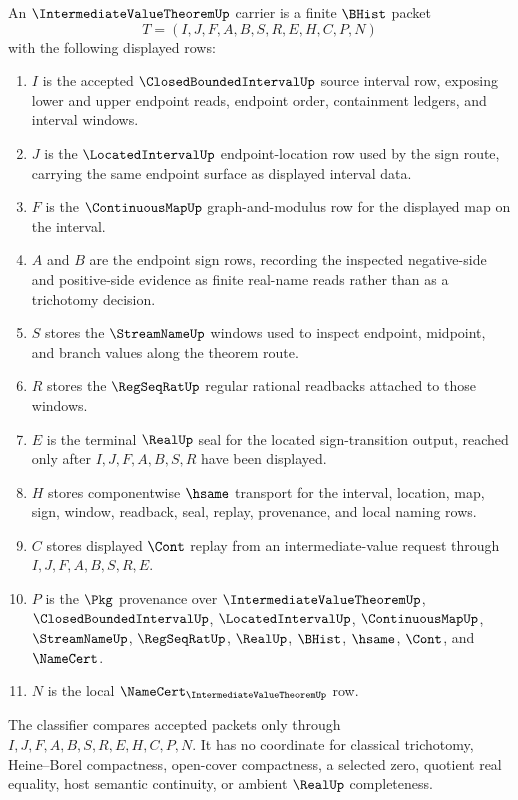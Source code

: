 \begin{definition}
\label{def:intermediate-value-theorem-carrier}
An $\IntermediateValueTheoremUp$ carrier is a finite $\BHist$ packet
$$
T=(I,J,F,A,B,S,R,E,H,C,P,N)
$$
with the following displayed rows:
\begin{enumerate}
\item $I$ is the accepted $\ClosedBoundedIntervalUp$ source interval row, exposing lower and upper endpoint reads, endpoint order, containment ledgers, and interval windows.
\item $J$ is the $\LocatedIntervalUp$ endpoint-location row used by the sign route, carrying the same endpoint surface as displayed interval data.
\item $F$ is the $\ContinuousMapUp$ graph-and-modulus row for the displayed map on the interval.
\item $A$ and $B$ are the endpoint sign rows, recording the inspected negative-side and positive-side evidence as finite real-name reads rather than as a trichotomy decision.
\item $S$ stores the $\StreamNameUp$ windows used to inspect endpoint, midpoint, and branch values along the theorem route.
\item $R$ stores the $\RegSeqRatUp$ regular rational readbacks attached to those windows.
\item $E$ is the terminal $\RealUp$ seal for the located sign-transition output, reached only after $I,J,F,A,B,S,R$ have been displayed.
\item $H$ stores componentwise $\hsame$ transport for the interval, location, map, sign, window, readback, seal, replay, provenance, and local naming rows.
\item $C$ stores displayed $\Cont$ replay from an intermediate-value request through $I,J,F,A,B,S,R,E$.
\item $P$ is the $\Pkg$ provenance over $\IntermediateValueTheoremUp$, $\ClosedBoundedIntervalUp$, $\LocatedIntervalUp$, $\ContinuousMapUp$, $\StreamNameUp$, $\RegSeqRatUp$, $\RealUp$, $\BHist$, $\hsame$, $\Cont$, and $\NameCert$.
\item $N$ is the local $\NameCert_{\IntermediateValueTheoremUp}$ row.
\end{enumerate}
The classifier compares accepted packets only through $I,J,F,A,B,S,R,E,H,C,P,N$. It has no coordinate for classical trichotomy, Heine--Borel compactness, open-cover compactness, a selected zero, quotient real equality, host semantic continuity, or ambient $\RealUp$ completeness.
\end{definition}

